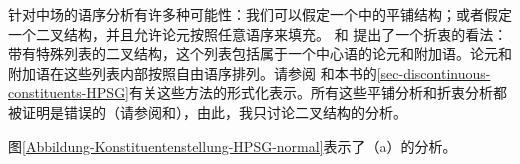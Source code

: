 针对中场的语序分析有许多种可能性：我们可以假定一个\gpsgc 中的平铺结构\citep{Kasper94a}；或者假定一个二叉结构，并且允许论元按照任意语序来填充。 \citet{Kathol2001a}和 \citet{Mueller99a,Mueller2002b,Mueller2004b}提出了一个折衷的看法：带有特殊列表的二叉结构，这个列表包括属于一个中心语的论元和附加语。论元和附加语在这些列表内部按照自由语序排列。请参阅 和本书的\ref{sec-discontinuous-constituents-HPSG}有关这些方法的形式化表示。所有这些平铺分析和折衷分析都被证明是错误的（请参阅\citealp{Mueller2005c,Mueller2004e}和\citealp[Section~9.5.1]{MuellerLehrbuch1}），由此，我只讨论二叉结构的分析。

图\vref{Abbildung-Konstituentenstellung-HPSG-normal}表示了（a）的分析。

